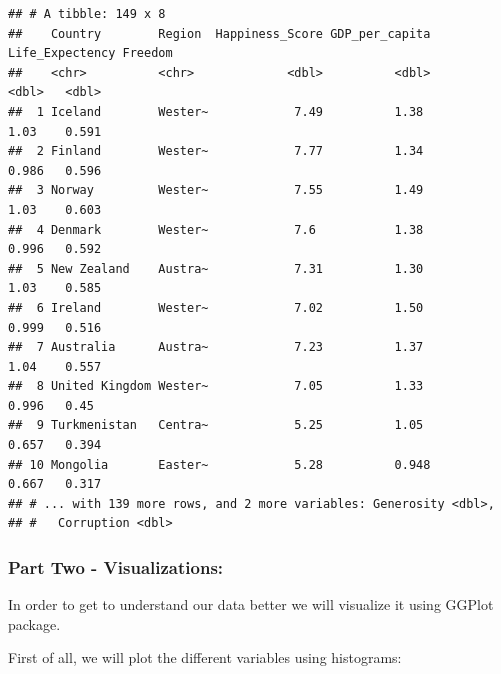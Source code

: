 \documentclass[
]{article}
\begin{document}
\begin{verbatim}
## # A tibble: 149 x 8
##    Country        Region  Happiness_Score GDP_per_capita Life_Expectency Freedom
##    <chr>          <chr>             <dbl>          <dbl>           <dbl>   <dbl>
##  1 Iceland        Wester~            7.49          1.38            1.03    0.591
##  2 Finland        Wester~            7.77          1.34            0.986   0.596
##  3 Norway         Wester~            7.55          1.49            1.03    0.603
##  4 Denmark        Wester~            7.6           1.38            0.996   0.592
##  5 New Zealand    Austra~            7.31          1.30            1.03    0.585
##  6 Ireland        Wester~            7.02          1.50            0.999   0.516
##  7 Australia      Austra~            7.23          1.37            1.04    0.557
##  8 United Kingdom Wester~            7.05          1.33            0.996   0.45 
##  9 Turkmenistan   Centra~            5.25          1.05            0.657   0.394
## 10 Mongolia       Easter~            5.28          0.948           0.667   0.317
## # ... with 139 more rows, and 2 more variables: Generosity <dbl>,
## #   Corruption <dbl>
\end{verbatim}

\hfill\break

\hypertarget{part-two---visualizations}{%
\subsubsection{Part Two -
Visualizations:}\label{part-two---visualizations}}

In order to get to understand our data better we will visualize it using
GGPlot package.

First of all, we will plot the different variables using histograms:
\end{document}
